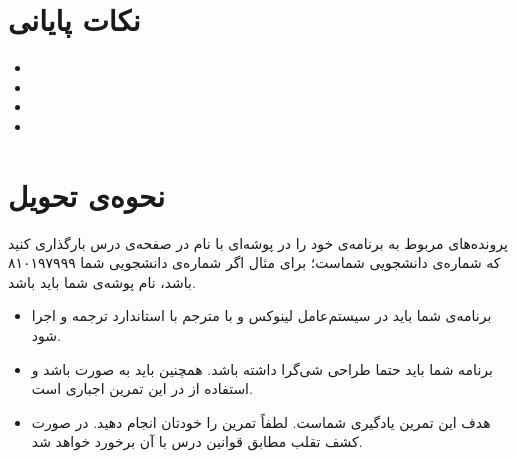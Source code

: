 \documentclass{utap}
\begin{document}
	\section{نکات پایانی}
		\begin{itemize}
			\item
			\item
			\item
			\item
		\end{itemize}

	\section{نحوه‌ی تحویل}
		پرونده‌‌های مربوط به برنامه‌ی خود را در پوشه‌ای با نام  در صفحه‌ی  درس بارگذاری کنید که  شماره‌ی دانشجویی شماست؛ برای مثال اگر شماره‌ی دانشجویی شما ۸۱۰۱۹۷۹۹۹ باشد، نام پوشه‌ی شما باید  باشد.
		\begin{itemize}
			\item
						برنامه‌ی شما باید در سیستم‌عامل لینوکس و با مترجم  با استاندارد  ترجمه و اجرا شود.
					\item
						برنامه شما باید حتما طراحی شی‌گرا داشته باشد. همچنین باید به صورت  باشد و استفاده از  در این تمرین اجباری است.
					\item
						هدف این تمرین یادگیری شماست. لطفاً تمرین را خودتان انجام دهید. در صورت کشف تقلب مطابق قوانین درس با آن برخورد خواهد شد.
		\end{itemize}
\end{document}

